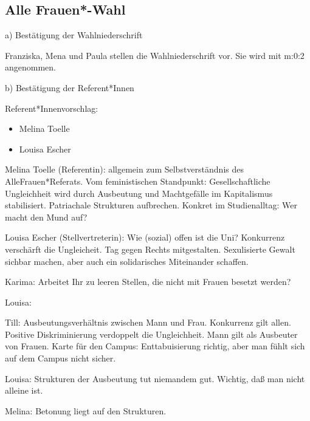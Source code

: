 \documentclass[ngerman,headheight=70pt]{scrartcl}
\begin{document}

    \subsection{Alle Frauen*-Wahl}

    a) Bestätigung der Wahlniederschrift

    Franziska, Mena und Paula stellen die Wahlniederschrift vor.
    Sie wird mit m:0:2 angenommen.

    b) Bestätigung der Referent*Innen

    Referent*Innenvorschlag:
    \begin{itemize}
        \item Melina Toelle
        \item Louisa Escher
    \end{itemize}

    Melina Toelle (Referentin): allgemein zum Selbstverständnis des AlleFrauen*Referats.
    Vom feministischen Standpunkt: Gesellschaftliche Ungleichheit wird durch Ausbeutung
    und Machtgefälle im Kapitalismus stabilisiert. Patriachale Strukturen aufbrechen.
    Konkret im Studienalltag: Wer macht den Mund auf?

    Louisa Escher (Stellvertreterin): Wie (sozial) offen ist die Uni? Konkurrenz
    verschärft die Ungleicheit. Tag gegen Rechts mitgestalten. Sexulisierte Gewalt
    sichbar machen, aber auch ein solidarisches Miteinander schaffen.

    Karima: Arbeitet Ihr zu leeren Stellen, die nicht mit Frauen besetzt werden?

    Louisa:

    Till: Ausbeutungsverhältnis zwischen Mann und Frau. Konkurrenz gilt allen.
    Positive Diskriminierung verdoppelt die Ungleichheit. Mann gilt als Ausbeuter
    von Frauen. Karte für den Campus: Enttabuisierung richtig, aber man fühlt sich
    auf dem Campus nicht sicher.

    Louisa: Strukturen der Ausbeutung tut niemandem gut.
    Wichtig, daß man nicht alleine ist.

    Melina: Betonung liegt auf den Strukturen.
\end{document}
